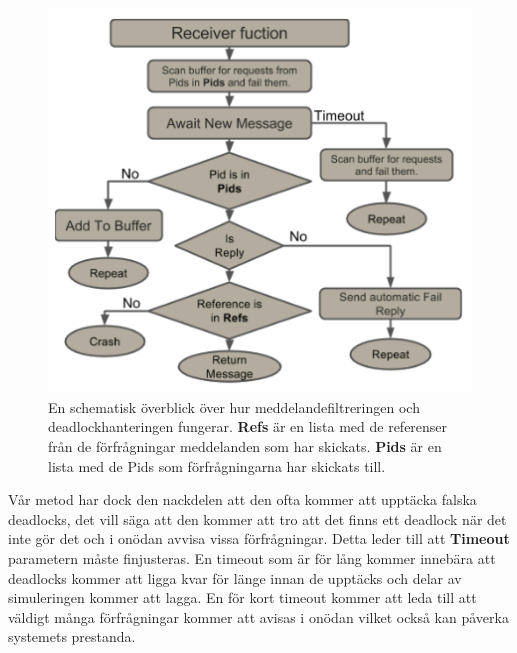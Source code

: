 \documentclass[12pt]{article}
\begin{document}
\begin{figure}[H]
    \centering
    \includegraphics[width=\textwidth]{BugsLife-Fig4.png}
    \caption{
        En schematisk överblick över hur meddelandefiltreringen och deadlockhanteringen fungerar.
        \textbf{Refs} är en lista med de referenser från de förfrågningar meddelanden som har skickats.
        \textbf{Pids} är en lista med de Pids som förfrågningarna har skickats till.
    }\label{fig:deadlock}
\end{figure}

Vår metod har dock den nackdelen att den ofta kommer att upptäcka falska deadlocks,
det vill säga att den kommer att tro att det finns ett deadlock när det inte gör det och i onödan avvisa vissa förfrågningar.
Detta leder till att \textbf{Timeout} parametern måste finjusteras.
En timeout som är för lång kommer innebära att deadlocks kommer att ligga kvar för länge innan de upptäcks och delar av simuleringen kommer att lagga.
En för kort timeout kommer att leda till att väldigt många förfrågningar kommer att avisas i onödan vilket också kan påverka systemets prestanda.
\end{document}

